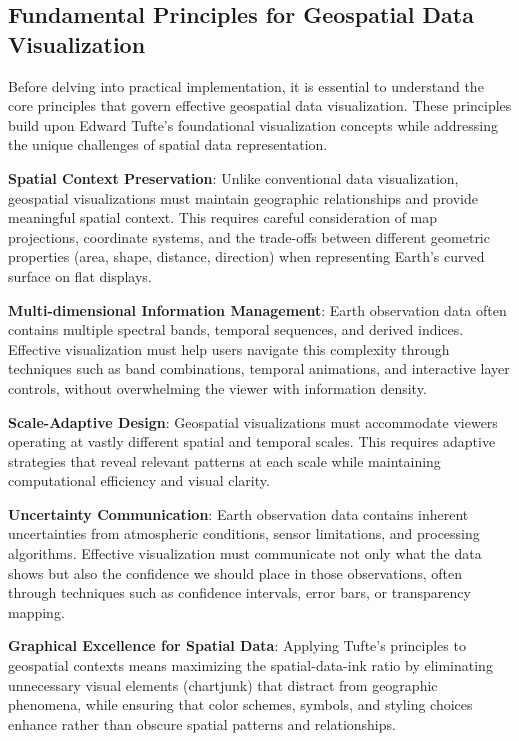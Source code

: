 \subsection{Fundamental Principles for Geospatial Data Visualization}

Before delving into practical implementation, it is essential to understand the core principles that govern effective geospatial data visualization. These principles build upon Edward Tufte's foundational visualization concepts while addressing the unique challenges of spatial data representation.

\textbf{Spatial Context Preservation}: Unlike conventional data visualization, geospatial visualizations must maintain geographic relationships and provide meaningful spatial context. This requires careful consideration of map projections, coordinate systems, and the trade-offs between different geometric properties (area, shape, distance, direction) when representing Earth's curved surface on flat displays.

\textbf{Multi-dimensional Information Management}: Earth observation data often contains multiple spectral bands, temporal sequences, and derived indices. Effective visualization must help users navigate this complexity through techniques such as band combinations, temporal animations, and interactive layer controls, without overwhelming the viewer with information density.

\textbf{Scale-Adaptive Design}: Geospatial visualizations must accommodate viewers operating at vastly different spatial and temporal scales. This requires adaptive strategies that reveal relevant patterns at each scale while maintaining computational efficiency and visual clarity.

\textbf{Uncertainty Communication}: Earth observation data contains inherent uncertainties from atmospheric conditions, sensor limitations, and processing algorithms. Effective visualization must communicate not only what the data shows but also the confidence we should place in those observations, often through techniques such as confidence intervals, error bars, or transparency mapping.

\textbf{Graphical Excellence for Spatial Data}: Applying Tufte's principles to geospatial contexts means maximizing the spatial-data-ink ratio by eliminating unnecessary visual elements (chartjunk) that distract from geographic phenomena, while ensuring that color schemes, symbols, and styling choices enhance rather than obscure spatial patterns and relationships.

